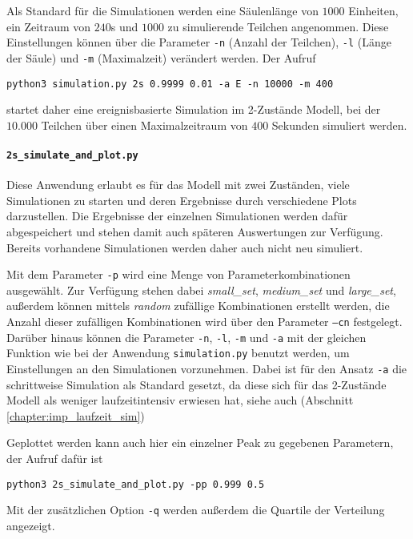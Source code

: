 Als Standard für die Simulationen werden eine Säulenlänge von $1000$ Einheiten, ein Zeitraum von $240$s und $1000$ zu simulierende Teilchen angenommen. Diese Einstellungen können über die Parameter \texttt{-n} (Anzahl der Teilchen), \texttt{-l} (Länge der Säule) und \verb!-m! (Maximalzeit) verändert werden.
Der Aufruf
\begin{verbatim}
python3 simulation.py 2s 0.9999 0.01 -a E -n 10000 -m 400
\end{verbatim}
startet daher eine ereignisbasierte Simulation im 2-Zustände Modell, bei der $10.000$ Teilchen über einen Maximalzeitraum von $400$ Sekunden simuliert werden.


\paragraph{\texttt{2s\_simulate\_and\_plot.py}}
Diese Anwendung erlaubt es für das Modell mit zwei Zuständen, viele Simulationen zu starten und deren Ergebnisse durch verschiedene Plots darzustellen. Die Ergebnisse der einzelnen Simulationen werden dafür abgespeichert und stehen damit auch späteren Auswertungen zur Verfügung. Bereits vorhandene Simulationen werden daher auch nicht neu simuliert.

Mit dem Parameter \texttt{-p} wird eine Menge von Parameterkombinationen ausgewählt. Zur Verfügung stehen dabei \textit{small\_set}, \textit{medium\_set} und \textit{large\_set}, außerdem können mittels \textit{random} zufällige Kombinationen erstellt werden, die Anzahl dieser zufälligen Kombinationen wird über den Parameter \texttt{--cn} festgelegt. %
Darüber hinaus können die Parameter \texttt{-n}, \texttt{-l}, \texttt{-m} und \texttt{-a} mit der gleichen Funktion wie bei der Anwendung \texttt{simulation.py} benutzt werden, um Einstellungen an den Simulationen vorzunehmen. Dabei ist für den Ansatz \texttt{-a} die schrittweise Simulation als Standard gesetzt, da diese sich für das 2-Zustände Modell als weniger laufzeitintensiv erwiesen hat, siehe auch (Abschnitt \ref{chapter:imp_laufzeit_sim})

Geplottet werden kann auch hier ein einzelner Peak zu gegebenen Parametern, der Aufruf dafür ist
\begin{verbatim}
python3 2s_simulate_and_plot.py -pp 0.999 0.5 
\end{verbatim}
Mit der zusätzlichen Option \verb!-q! werden außerdem die Quartile der Verteilung angezeigt.

